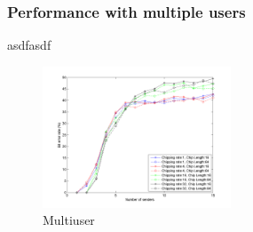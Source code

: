 		\subsubsection{Performance with multiple users}
		asdfasdf
		\begin{figure}[H]
			\includegraphics[width=0.5\textwidth]{imgs/results/plot_mode_fhss-test_numSenders-rep_20-dataRate_8-dataLength_128.png}
			\caption{Multiuser}
			\label{fig:fhss_multiuser}
		\end{figure}